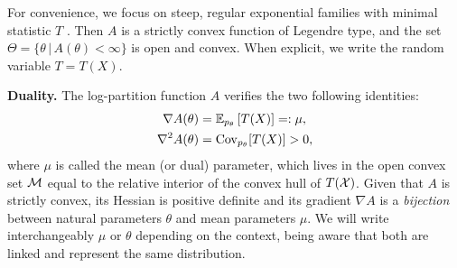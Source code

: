 \documentclass[twoside]{article}
\newcommand*{\expect}[2][]{\ensuremath{\mathbb{E}_{#1} \left[ #2 \right] }} %
\newcommand{\cond}{\,\vert\,}
\newcommand{\logpart}{A}
\newcommand{\nat}{\theta}
\newcommand{\m}{\mu}
\newcommand{\meanp}{\m}
\begin{document}
For convenience, we focus on steep, regular exponential families with minimal statistic $T$ \citep{barndoffnielsen2014information}.
Then $\logpart$ is a strictly convex function of Legendre type,
and the set $\Theta = \{ \nat \cond \logpart(\nat) < \infty\}$ is open and convex.
When explicit, we write the random variable $T = T(X)$.


{\bf Duality.}
The log-partition function $\logpart$ verifies the two following identities:
\begin{align}
    \nabla\logpart(\nat) &=  \expect[p_\nat]{T(X)} =: \meanp, \\
    \nabla^2 \logpart(\nat) &= \Cov_{p_\nat}[T(X)] > 0,
\end{align}
where $\meanp$ is called the mean (or dual) parameter, which lives in the open convex set ${\mathcal M}$ equal to the relative interior of the convex hull of $T({\mathcal X})$.
Given that $\logpart$ is strictly convex, its Hessian is positive definite and its gradient $\nabla \logpart$ is a \textit{bijection} between natural parameters $\nat$ and mean parameters $\m$.
We will write interchangeably $\m$ or  $\nat$ depending on the context, being aware that both are linked and represent the same distribution.
\end{document}
